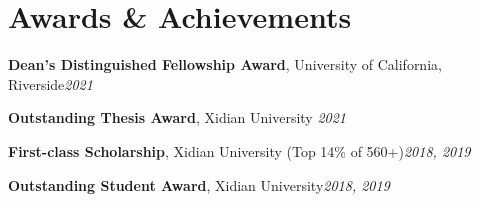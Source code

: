 \documentclass[letterpaper,11pt]{article}
\makeatletter
\newcommand{\resumeItem}[1]{
  \item\small{
    {#1 \vspace{-2pt}}
  }
}
\newcommand{\resumeProjectHeading}[2]{
    \vspace{-2pt}\item
    \begin{tabular*}{0.97\textwidth}{l@{\extracolsep{\fill}}r}
      \small#1 & #2 \\
    \end{tabular*}\vspace{-7pt}
}
\newcommand{\resumeSubHeadingListStart}{\begin{itemize}[leftmargin=0.15in, label={}]}
\newcommand{\resumeSubHeadingListEnd}{\end{itemize}}
\newcommand{\resumeItemListStart}{\begin{itemize}}
\newcommand{\resumeItemListEnd}{\end{itemize}\vspace{-5pt}}
\makeatother
\begin{document}
\section{Awards \& Achievements}
  \vspace{2pt}
  \resumeSubHeadingListStart
    \small{\item{
        \textbf{Dean’s Distinguished Fellowship Award}, University of California, Riverside\hfill \textit{2021} \\ \vspace{3pt}
        
        \textbf{Outstanding Thesis Award}, Xidian University \hfill \textit{2021} \\ \vspace{3pt}
        
        \textbf{First-class Scholarship}, Xidian University (Top 14\% of 560+)\hfill \textit{2018, 2019} \\ \vspace{3pt}
        
        \textbf{Outstanding Student Award}, Xidian University\hfill \textit{2018, 2019} \\ \vspace{3pt}
    }}
  \resumeSubHeadingListEnd




      
      
      
\end{document}
